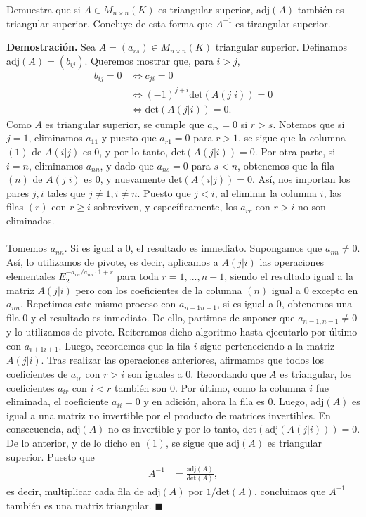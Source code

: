 \documentclass[11pt]{scrartcl}
\begin{document}
\newpage
\begin{mdframed}[style=mdpurplebox, frametitle={Ejercicio 7, Tarea 01, Álgebra Lineal II}]
    Demuestra que si $A\in M_{n\times n}(K)$ es triangular superior, adj$(A)$ también es triangular superior. Concluye de esta
    forma que $A^{-1}$ es tirangular superior.
\end{mdframed}
\textbf{Demostración.} Sea $A=(a_{rs}) \in M_{n\times n}(K)$ triangular superior. Definamos adj$(A)=\left(b_{ij}\right)$. Queremos mostrar que,
para $i>j$,
\begin{align*}
    b_{ij}=0 &\iff c_{ji}=0 \\
    &\iff (-1)^{j+i}\text{det}\left(A\left(j|i\right)\right)=0 \\
    &\iff \text{det}\left(A\left(j|i\right)\right)=0. \tag{1}
\end{align*}
Como $A$ es triangular superior, se cumple que $a_{rs}=0$ si $r>s$. Notemos que si $j=1$, eliminamos $a_{11}$ y puesto que $a_{r1}=0$ para $r>1$,
se sigue que la columna $(1)$ de $A(i|j)$ es 0, y por lo tanto, det$\left(A\left(j|i\right)\right)=0$. Por otra parte, si $i=n$, eliminamos $a_{nn}$,
y dado que $a_{ns}=0$ para $s<n$, obtenemos que la fila $(n)$ de $A\left(j|i\right)$ es 0, y nuevamente det$\left(A\left(i|j\right)\right)=0$. Así,
nos importan los pares $j,i$ tales que $j\neq 1,i\neq n$. Puesto que $j<i$, al eliminar la columna $i$, las filas $(r)$ con $r\geq i$ sobreviven, y específicamente,
los $a_{rr}$ con $r>i$ no son eliminados. \\ \\ 
Tomemos $a_{nn}$. Si es igual a 0, el resultado es inmediato. Supongamos que $a_{nn}\neq 0$. Así, lo utilizamos de pivote,
es decir, aplicamos a $A\left(j|i\right)$ las operaciones elementales $E_{2}^{-a_{rn}/a_{nn}\cdot 1 + r}$ para toda $r=1,...,n-1$, siendo el resultado igual a la matriz $A(j|i)$
pero con los coeficientes de la columna $(n)$ igual a 0 excepto en $a_{nn}$. Repetimos este mismo proceso con $a_{n-1n-1}$, si es igual a $0$, obtenemos una fila $0$ y el resultado
es inmediato. De ello, partimos de suponer que $a_{n-1,n-1}\neq 0$ y lo utilizamos de pivote. Reiteramos dicho algoritmo hasta ejecutarlo por último con $a_{i+1i+1}$. Luego,
recordemos que la fila $i$ sigue perteneciendo a la matriz $A(j|i)$. Tras realizar las operaciones anteriores, afirmamos que todos
los coeficientes de $a_{ir}$ con $r>i$ son iguales a 0. Recordando que $A$ es triangular, los coeficientes $a_{ir}$ con $i<r$ también son $0$. Por último, como la columna $i$ fue eliminada,
el coeficiente $a_{ii}=0$ y en adición, ahora la fila es $0$. Luego, adj$(A)$ es igual a una matriz no invertible por el producto de matrices invertibles. En consecuencia, adj$(A)$ no es invertible y por lo tanto, det$\left(\text{adj}(A\left(j|i\right))\right)=0$. \\
De lo anterior, y de lo dicho en $(1)$, se sigue que $\text{adj}(A)$ es triangular superior. Puesto que
\begin{align*}
    A^{-1} &=
    \frac{\text{adj}(A)}{\text{det}(A)},
\end{align*}
es decir, multiplicar cada fila de adj$(A)$ por $1/\text{det}(A)$, concluimos que $A^{-1}$ también es una matriz triangular. \hfill $\blacksquare$
\end{document}
